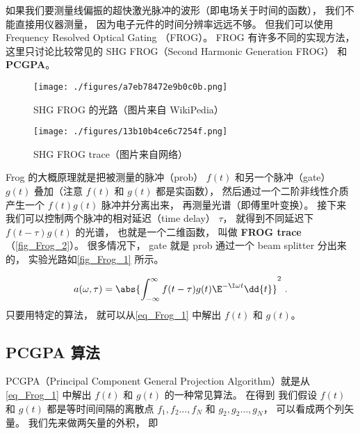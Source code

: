 
\begin{issues}
\issueMissDepend
\end{issues}

如果我们要测量线偏振的超快激光脉冲的波形（即电场关于时间的函数）， 我们不能直接用仪器测量， 因为电子元件的时间分辨率远远不够。 但我们可以使用 Frequency Resolved Optical Gating （FROG）。 FROG 有许多不同的实现方法， 这里只讨论比较常见的 SHG FROG（Second Harmonic Generation FROG） 和 \textbf{PCGPA}。

\begin{figure}[ht]
\centering
\texttt{[image: ./figures/a7eb78472e9b0c0b.png]}
\caption{SHG FROG 的光路（图片来自 WikiPedia）} \label{fig_Frog_1}
\end{figure}

\begin{figure}[ht]
\centering
\texttt{[image: ./figures/13b10b4ce6c7254f.png]}
\caption{SHG FROG trace（图片来自网络）} \label{fig_Frog_2}
\end{figure}

Frog 的大概原理就是把被测量的脉冲（prob） $f(t)$ 和另一个脉冲（gate） $g(t)$ 叠加（注意 $f(t)$ 和 $g(t)$ 都是实函数）， 然后通过一个二阶非线性介质产生一个 $f(t)g(t)$ 脉冲并分离出来， 再测量光谱（即傅里叶变换）。 接下来我们可以控制两个脉冲的相对延迟（time delay） $\tau$， 就得到不同延迟下 $f(t - \tau)g(t)$ 的光谱， 也就是一个二维函数， 叫做 \textbf{FROG trace}（\autoref{fig_Frog_2}）。 很多情况下， gate 就是 prob 通过一个 beam splitter 分出来的， 实验光路如\autoref{fig_Frog_1} 所示。%

\begin{equation}\label{eq_Frog_1}
a(\omega, \tau) = \abs{\int_{-\infty}^{\infty} f(t-\tau) g(t) \E^{-\I\omega t} \dd{t}}^2~.
\end{equation}
只要用特定的算法， 就可以从\autoref{eq_Frog_1} 中解出 $f(t)$ 和 $g(t)$。

\subsection{PCGPA 算法}

PCGPA（Principal Component General Projection Algorithm）就是从\autoref{eq_Frog_1} 中解出 $f(t)$ 和 $g(t)$ 的一种常见算法。 在得到 我们假设 $f(t)$ 和 $g(t)$ 都是等时间间隔的离散点 $f_1, f_2\dots, f_N$ 和 $g_2, g_2\dots, g_N$， 可以看成两个列矢量。 我们先来做两矢量的外积， 即


